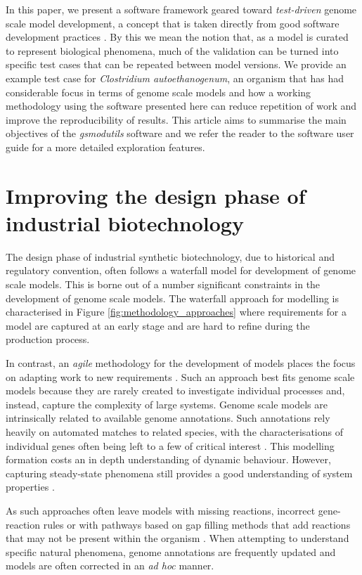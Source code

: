 \documentclass[journal=asbcd6,10pt]{achemso}
\begin{document}
In this paper, we present a software framework geared toward \textit{test-driven} genome scale model development, a concept that is taken directly from good software development practices \cite{martin2002agile}.
By this we mean the notion that, as a model is curated to represent biological phenomena, much of the validation can be turned into specific test cases that can be repeated between model versions.
We provide an example test case for \textit{Clostridium autoethanogenum}, an organism that has had considerable focus in terms of genome scale models and how a working methodology using the software presented here can reduce repetition of work and improve the reproducibility of results.
This article aims to summarise the main objectives of the \textit{gsmodutils} software and we refer the reader to the software user guide for a more detailed exploration features.

\section{Improving the design phase of industrial biotechnology}

The design phase of industrial synthetic biotechnology, due to historical and regulatory convention, often follows a waterfall model for development of genome scale models.
This is borne out of a number significant constraints in the development of genome scale models.
The waterfall approach for modelling is characterised in Figure \ref{fig:methodology_approaches} where requirements for a model are captured at an early stage and are hard to refine during the production process.

In contrast, an \textit{agile} methodology for the development of models places the focus on adapting work to new requirements \cite{martin2002agile}.
Such an approach best fits genome scale models because they are rarely created to investigate individual processes and, instead, capture the complexity of large systems.
Genome scale models are intrinsically related to available genome annotations.
Such annotations rely heavily on automated matches to related species, with the characterisations of individual genes often being left to a few of critical interest \cite{seemann2014prokka}.
This modelling formation costs an in depth understanding of dynamic behaviour. 
However, capturing steady-state phenomena still provides a good understanding of system properties \cite{o2015using}.

As such approaches often leave models with missing reactions, incorrect gene-reaction rules \cite{thiele2010protocol} or with pathways based on gap filling methods that add reactions that may not be present within the organism \cite{benedict2014likelihood}.
When attempting to understand specific natural phenomena, genome annotations are frequently updated and models are often corrected in an \textit{ad hoc} manner.
\end{document}
